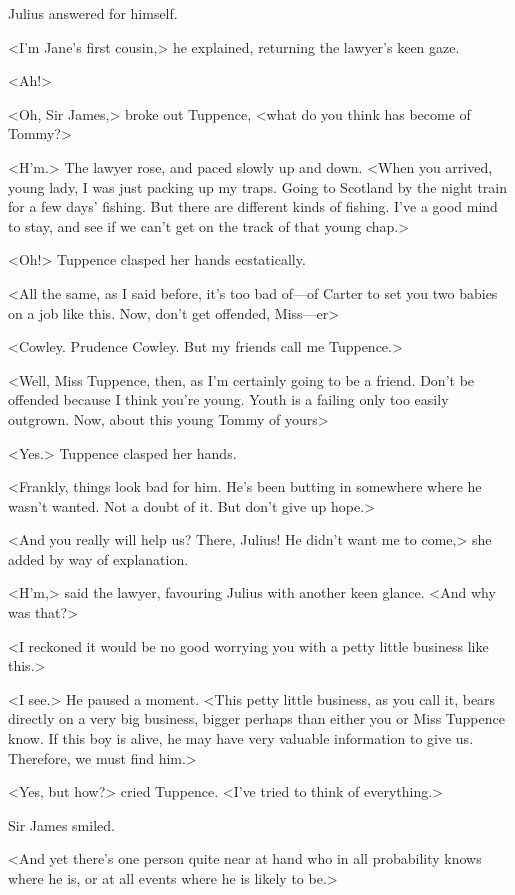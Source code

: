 Julius answered for himself.

<I'm Jane's first cousin,> he explained, returning the lawyer's keen gaze.

<Ah!>

<Oh, Sir James,> broke out Tuppence, <what do you think has become of Tommy?>

<H'm.> The lawyer rose, and paced slowly up and down. <When you arrived, young lady, I was just packing up my traps. Going to Scotland by the night train for a few days' fishing. But there are different kinds of fishing. I've a good mind to stay, and see if we can't get on the track of that young chap.>

<Oh!> Tuppence clasped her hands ecstatically.

<All the same, as I said before, it's too bad of—of Carter to set you two babies on a job like this. Now, don't get offended, Miss—er\longdash>

<Cowley. Prudence Cowley. But my friends call me Tuppence.>

<Well, Miss Tuppence, then, as I'm certainly going to be a friend. Don't be offended because I think you're young. Youth is a failing only too easily outgrown. Now, about this young Tommy of yours\longdash>

<Yes.> Tuppence clasped her hands.

<Frankly, things look bad for him. He's been butting in somewhere where he wasn't wanted. Not a doubt of it. But don't give up hope.>

<And you really will help us? There, Julius! He didn't want me to come,> she added by way of explanation.

<H'm,> said the lawyer, favouring Julius with another keen glance. <And why was that?>

<I reckoned it would be no good worrying you with a petty little business like this.>

<I see.> He paused a moment. <This petty little business, as you call it, bears directly on a very big business, bigger perhaps than either you or Miss Tuppence know. If this boy is alive, he may have very valuable information to give us. Therefore, we must find him.>

<Yes, but how?> cried Tuppence. <I've tried to think of everything.>

Sir James smiled.

<And yet there's one person quite near at hand who in all probability knows where he is, or at all events where he is likely to be.>

